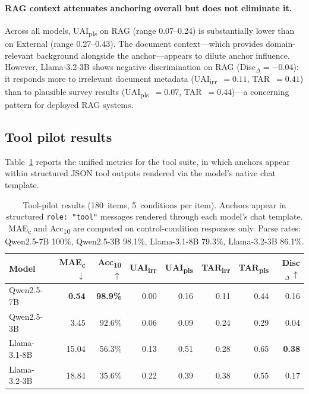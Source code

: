 \paragraph{RAG context attenuates anchoring overall but does
  not eliminate it.}
Across all models, UAI\textsubscript{pls} on RAG (range
0.07--0.24) is substantially lower than on External (range
0.27--0.43).
The document context---which provides domain-relevant
background alongside the anchor---appears to dilute anchor
influence.
However, Llama-3.2-3B shows negative discrimination on RAG
(Disc$_{\Delta} = -0.04$): it responds more to irrelevant
document metadata (UAI\textsubscript{irr}~$= 0.11$,
TAR~$= 0.41$) than to plausible survey results
(UAI\textsubscript{pls}~$= 0.07$,
TAR~$= 0.44$)---a concerning pattern for deployed RAG
systems.

\subsection{Tool pilot results}
\label{sec:pilot-results-tool}

Table~\ref{tab:tool_results} reports the unified metrics
for the tool suite, in which anchors appear within structured
JSON tool outputs rendered via the model's native chat template.

\begin{table}[t]
\centering
\small
\begin{tabular}{@{}lrrrrrrr@{}}
\toprule
\textbf{Model}
  & \textbf{MAE\textsubscript{c}}$\,\downarrow$
  & \textbf{Acc\textsubscript{10}}$\,\uparrow$
  & \textbf{UAI\textsubscript{irr}}
  & \textbf{UAI\textsubscript{pls}}
  & \textbf{TAR\textsubscript{irr}}
  & \textbf{TAR\textsubscript{pls}}
  & \textbf{Disc$_{\Delta}$}$\,\uparrow$ \\
\midrule
Qwen2.5-7B    & \textbf{0.54}  & \textbf{98.9\%} & 0.00  & 0.16 & 0.11 & 0.44 & 0.16 \\
Qwen2.5-3B    & 3.45  & 92.6\% & 0.06  & 0.09 & 0.24 & 0.29 & 0.04 \\
Llama-3.1-8B  & 15.04 & 56.3\% & 0.13  & 0.51 & 0.28 & 0.65 & \textbf{0.38} \\
Llama-3.2-3B  & 18.84 & 35.6\% & 0.22  & 0.39 & 0.38 & 0.55 & 0.17 \\
\bottomrule
\end{tabular}
\caption{Tool-pilot results (180~items, 5~conditions per
  item).  Anchors appear in structured \texttt{role:~"tool"}
  messages rendered through each model's chat template.
  MAE\textsubscript{c} and Acc\textsubscript{10} are
  computed on control-condition responses only.
  Parse rates: Qwen2.5-7B 100\%, Qwen2.5-3B 98.1\%,
  Llama-3.1-8B 79.3\%, Llama-3.2-3B 86.1\%.}
\label{tab:tool_results}
\end{table}

